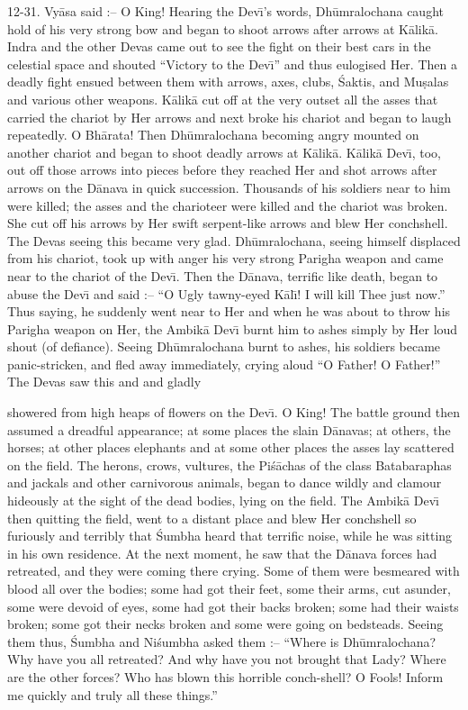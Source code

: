 12-31. Vy\=asa said :-- O King! Hearing the Dev\={\i}'s words, Dh\=umralochana caught hold of his very strong bow and began to shoot arrows after arrows at K\=alik\=a. Indra and the other Devas came out to see the fight on their best cars in the celestial space and shouted ``Victory to the Dev\={\i}'' and thus eulogised Her. Then a deadly fight ensued between them with arrows, axes, clubs, \'Saktis, and Mu\d{s}alas and various other weapons. K\=alik\=a cut off at the very outset all the asses that carried the chariot by Her arrows and next broke his chariot and began to laugh repeatedly. O Bh\=arata! Then Dh\=umralochana becoming angry mounted on another chariot and began to shoot deadly arrows at K\=alik\=a. K\=alik\=a Dev\={\i}, too, out off those arrows into pieces before they reached Her and shot arrows after arrows on the D\=anava in quick succession. Thousands of his soldiers near to him were killed; the asses and the charioteer were killed and the chariot was broken. She cut off his arrows by Her swift serpent-like arrows and blew Her conchshell. The Devas seeing this became very glad. Dh\=umralochana, seeing himself displaced from his chariot, took up with anger his very strong Parigha weapon and came near to the chariot of the Dev\={\i}. Then the D\=anava, terrific like death, began to abuse the Dev\={\i} and said :-- ``O Ugly tawny-eyed K\=al\={\i}! I will kill Thee just now.'' Thus saying, he suddenly went near to Her and when he was about to throw his Parigha weapon on Her, the Ambik\=a Dev\={\i} burnt him to ashes simply by Her loud shout (of defiance). Seeing Dh\=umralochana burnt to ashes, his soldiers became panic-stricken, and fled away immediately, crying aloud ``O Father! O Father!'' The Devas saw this and and gladly

showered from high heaps of flowers on the Dev\={\i}. O King! The battle ground then assumed a dreadful appearance; at some places the slain D\=anavas; at others, the horses; at other places elephants and at some other places the asses lay scattered on the field. The herons, crows, vultures, the Pi\'s\=achas of the class Batabaraphas and jackals and other carnivorous animals, began to dance wildly and clamour hideously at the sight of the dead bodies, lying on the field. The Ambik\=a Dev\={\i} then quitting the field, went to a distant place and blew Her conchshell so furiously and terribly that \'Sumbha heard that terrific noise, while he was sitting in his own residence. At the next moment, he saw that the D\=anava forces had retreated, and they were coming there crying. Some of them were besmeared with blood all over the bodies; some had got their feet, some their arms, cut asunder, some were devoid of eyes, some had got their backs broken; some had their waists broken; some got their necks broken and some were going on bedsteads. Seeing them thus, \'Sumbha and Ni\'sumbha asked them :-- ``Where is Dh\=umralochana? Why have you all retreated? And why have you not brought that Lady? Where are the other forces? Who has blown this horrible conch-shell? O Fools! Inform me quickly and truly all these things.''

